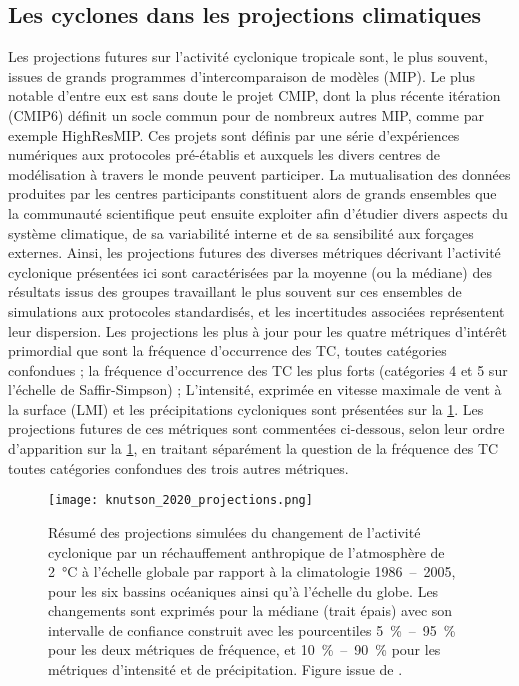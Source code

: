\documentclass[../main.tex]{subfiles}
\begin{document}
\subsection{Les cyclones dans les projections climatiques}\label{sec:projections_futures}

Les projections futures sur l'activité cyclonique tropicale sont, le plus souvent, issues de grands programmes d'intercomparaison de modèles (MIP). Le plus
notable d'entre eux est sans doute le projet CMIP, dont la plus récente itération (CMIP6) définit un socle commun pour de nombreux autres MIP, comme par exemple
HighResMIP. Ces projets sont définis par une série d'expériences numériques aux protocoles pré-établis et auxquels les divers centres de modélisation à travers
le monde peuvent participer. La mutualisation des données produites par les centres participants constituent alors de grands ensembles que la communauté
scientifique peut ensuite exploiter afin d'étudier divers aspects du système climatique, de sa variabilité interne et de sa sensibilité aux forçages externes.
Ainsi, les projections futures des diverses métriques décrivant l'activité cyclonique présentées ici sont caractérisées par la moyenne (ou la médiane) des
résultats issus des groupes travaillant le plus souvent sur ces ensembles de simulations aux protocoles standardisés, et les incertitudes associées représentent
leur dispersion. Les projections les plus à jour pour les quatre métriques d'intérêt primordial que sont la fréquence d'occurrence des TC, toutes catégories
confondues ; la fréquence d'occurrence des TC les plus forts (catégories 4 et 5 sur l'échelle de Saffir-Simpson) ; L'intensité, exprimée en vitesse maximale de
vent à la surface (LMI) et les précipitations cycloniques sont présentées sur la \cref{fig:projections_TC}. Les projections futures de ces métriques sont
commentées ci-dessous, selon leur ordre d'apparition sur la \cref{fig:projections_TC}, en traitant séparément la question de la fréquence des TC toutes
catégories confondues des trois autres métriques.
%
\begin{figure}[tb]
    \centering
    \texttt{[image: knutson\_2020\_projections.png]}
    \caption{Résumé des projections simulées du changement de l'activité cyclonique par un réchauffement anthropique de l'atmosphère de \SI{2}{\degreeCelsius} à
        l'échelle globale par rapport à la climatologie \num{1986}~--~\num{2005}, pour les six bassins océaniques ainsi qu'à l'échelle du globe. Les changements
        sont exprimés pour la médiane (trait épais) avec son intervalle de confiance construit avec les pourcentiles \SI{5}{\percent}~--~\SI{95}{\percent} pour
        les deux métriques de fréquence, et \SI{10}{\percent}~--~\SI{90}{\percent} pour les métriques d'intensité et de précipitation. Figure issue de
        \textcite{knutson_tropical_2020}.}
    \label{fig:projections_TC}
\end{figure}
\end{document}
